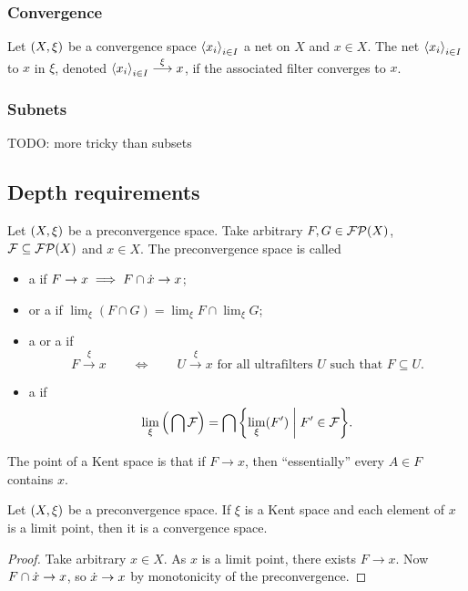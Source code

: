 \subsubsection{Convergence}
\begin{definition}
Let $\left( X,\xi \right)$ be a convergence space $\left\langle x_i \right\rangle_{i\in I}$ a net on $X$ and $x\in X$. The net $\left\langle x_i \right\rangle_{i\in I}$  to $x$ in $\xi$, denoted $\left\langle x_i \right\rangle_{i\in I} \overset{\xi}{\longrightarrow} x$, if the associated filter converges to $x$.
\end{definition}


\subsubsection{Subnets}
TODO: more tricky than subsets

\subsection{Depth requirements}
\begin{definition}
Let $\left( X,\xi \right)$ be a preconvergence space. Take arbitrary $F,G \in \operatorname{\mathcal{FP}}(X)$, $\mathcal{F}\subseteq \operatorname{\mathcal{FP}}(X)$ and $x\in X$. The preconvergence space is called
\begin{itemize}
\item a  if $F \to x \implies F\cap \dot{x} \to x$;
\item {} or a  if $\lim_\xi(F\cap G) = \lim_\xi F \cap \lim_\xi G$;
\item a  or a  if
\[ F\overset{\xi}{\longrightarrow} x \qquad\iff\qquad \text{$U\overset{\xi}{\longrightarrow} x$ for all ultrafilters $U$ such that $F\subseteq U$.} \]
\item a  if 
\[ \lim_\xi\Big(\bigcap \mathcal{F}\Big) = \bigcap \setbuilder{\lim_\xi(F')}{F'\in \mathcal{F}}. \]
\end{itemize}
\end{definition}

The point of a Kent space is that if $F\to x$, then ``essentially'' every $A\in F$ contains $x$.

\begin{lemma}
Let $\left( X,\xi \right)$ be a preconvergence space. If $\xi$ is a Kent space and each element of $x$ is a limit point, then it is a convergence space.
\end{lemma}
\begin{proof}
Take arbitrary $x\in X$. As $x$ is a limit point, there exists $F\to x$. Now $F\cap \dot{x} \to x$, so $\dot{x} \to x$ by monotonicity of the preconvergence.
\end{proof}

